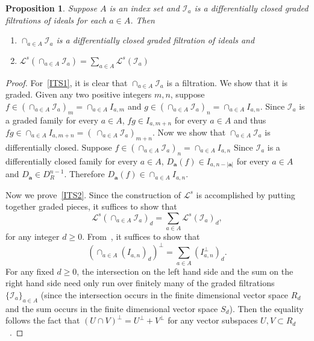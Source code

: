 \documentclass[12pt, reqno]{amsart}
\numberwithin{equation}{section}
\newcommand{\ba}{\mathbf{a}}
\newcommand{\cL}{{\mathcal L}}
\newcommand{\I}{{\mathcal I}}
\renewcommand{\L}{{\mathcal L}}
\theoremstyle{plain} %
\newtheorem{prop}[thm]{Proposition}
\theoremstyle{definition}
\theoremstyle{remark}
\renewcommand{\L}{\mathcal{L}}
\begin{document}
\begin{prop}\label{prop:IntersectionToSum}
	Suppose $A$ is an index set and $\I_a$ is a differentially closed graded filtrations of ideals for each $a\in A$.  Then
	\begin{enumerate}
		\item\label{ITS1} $\cap_{a\in A}\I_a$ is a differentially closed graded filtration of ideals and
		\item\label{ITS2} $\cL^s(\cap_{a\in A} \I_a)=\sum_{a\in A} \L^s(\I_a)$
	\end{enumerate}
\end{prop}
\begin{proof}
	
	For~\eqref{ITS1}, it is clear that $\cap_{a\in A}\I_a$ is a filtration.  We show that it is graded.  Given any two positive integers $m,n$, suppose $f\in \left(\cap_{a\in A} \I_a \right)_m=\cap_{a\in A} I_{a,m}$ and $g\in  \left(\cap_{a\in A} \I_a \right)_n=\cap_{a\in A} I_{a,n}$.  Since $\I_a$ is a graded family for every $a\in A$, $fg\in I_{a,m+n}$ for every $a\in A$ and thus $fg\in \cap_{a\in A} I_{a,m+n}=  \left(\ \cap_{a\in A} \I_a \right)_{m+n}$.  Now we show that $\cap_{a\in A}\I_a$ is differentially closed.  Suppose $f\in \left(\cap_{a\in A} \I_a \right)_{n}=\cap_{a\in A} I_{a,n}$ Since $\I_a$ is a differentially closed family for every $a\in A$, $D_{\ba}(f)\in I_{a,n-|\ba|}$ for every $a \in A$ and $D_{\ba}\in D^{n-1}_R$.  Therefore $D_{\ba}(f)\in\cap_{a\in A} I_{a,n}$.
	
	Now we prove~\eqref{ITS2}.  Since the construction of $\L^s$ is accomplished by putting together graded pieces, it suffices to show that
	\[
	\L^s(\cap_{a\in A} \I_a)_d=\sum_{a \in A} \L^s(\I_a)_d,
	\]
	for any integer $d\ge 0$.  From~, it suffices to show that
	\[
	\left(\cap_{a\in A} (I_{a,n})_d\right)^{\perp}=\sum_{a\in A} (I_{a,n}^\perp)_d.
	\]
	For any fixed $d\ge 0$, the intersection on the left hand side and the sum on the right hand side need only run over finitely many of the graded filtrations $\{\I_a\}_{a\in A}$ (since the intersection occurs in the finite dimensional vector space $R_d$ and the sum occurs in the finite dimensional vector space $S_d$).  Then the equality follows the fact that $(U\cap V)^\perp=U^\perp+V^\perp$ for any vector subspaces $U,V\subset R_d$~\cite[Lemma~2.7]{Ger95}.
\end{proof}
\end{document}
